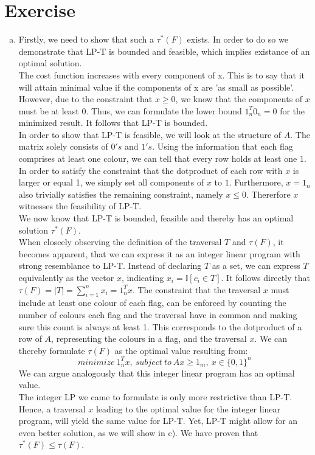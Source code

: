 \documentclass{article}
\newcounter{homeworkProblemCounter} %
\newcommand{\homeworkProblemName}{}
\newenvironment{homeworkProblem}[1][Exercise \arabic{homeworkProblemCounter}]{ %
\stepcounter{homeworkProblemCounter} %
\renewcommand{\homeworkProblemName}{#1} %
\section{\homeworkProblemName} %
}{
}
\begin{document}
\begin{homeworkProblem}
\begin{enumerate}[(a)]
\item
	Firstly, we need to show that such a \( \tau^{*}(F)\) exists. In order to do so we demonstrate that LP-T is bounded and feasible, which implies existance of an optimal solution. \\
	The cost function increases with every component of x. This is to say that it will attain minimal value if the components of x are 'as small as possible'. However, due to the constraint that \(x \geq 0 \), we know that the components of \(x\) must be at least \(0\). Thus, we can formulate the lower bound \( 1_n^T 0_n = 0 \) for the minimized result. It follows that LP-T is bounded. \\
	In order to show that LP-T is feasible, we will look at the structure of \(A\). The matrix solely consists of \(0's\) and \(1's\). Using the information that each flag comprises at least one colour, we can tell that every row holds at least one \(1\). In order to satisfy the constraint that the dotproduct of each row with \(x\) is larger or equal 1, we simply set all components of \(x\) to \(1\). Furthermore, \(x = 1_n\) also trivially satisfies the remaining constraint, namely \(x \leq 0\). Thererfore \(x\) witnesses the feasibility of LP-T. \\
	We now know that LP-T is bounded, feasible and thereby has an optimal solution \( \tau^{*}(F) \). \\
	When closeely observing the definition of the traversal \( T\) and \(\tau(F)\), it becomes apparent, that we can express it as an integer linear program with strong resemblance to LP-T. Instead of declaring \(T\) as a set, we can express \(T\) equivalently as the vector \(x\), indicating \(x_i = \mathbb{I}[c_i \in T ]\). It follows directly that \( \tau(F) = |T| = \sum_{i=1}^{n} x_i = 1_n ^Tx \). The constraint that the traversal \(x\) must include at least one colour of each flag, can be enforced by counting the number of colours each flag and the traversal have in common and making sure this count is always at least 1. This corresponds to the dotproduct of a row of \(A\), representing the colours in a flag, and the traversal \(x\). We can thereby formulate \(\tau(F)\) as the optimal value resulting from:
	\[ minimize\ 1_n^Tx,\ subject\ to\ Ax \geq 1_m,\ x \in \{0,1\}^n 
	\]
	We can argue analogously that this integer linear program has an optimal value. \\
	The integer LP we came to formulate is only more restrictive than LP-T. Hence, a traversal \(x\) leading to the optimal value for the integer linear program, will yield the same value for LP-T. Yet, LP-T might allow for an even better solution, as we will show in c). We have proven that \(\tau^{*}(F) \leq \tau(F)\).


\end{enumerate}
\end{homeworkProblem}
\end{document}
